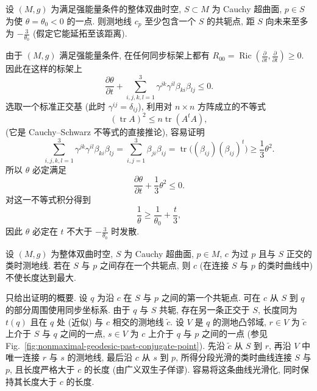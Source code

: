 \begin{RiemannProposition}\label{prop:timelike-focusing-under-strong-energy-condition}
设 $(M,g)$ 为满足强能量条件的整体双曲时空, $S\subset M$ 为 Cauchy 超曲面, $p\in S$ 为使 $\theta=\theta_0<0$ 的一点. 则测地线 $c_p$ 至少包含一个 $S$ 的共轭点, 距 $S$ 向未来至多为 $-\frac{3}{\theta_0}$ (假定它能延拓至该距离).
\end{RiemannProposition}

\begin{RiemannProof}
由于 $(M,g)$ 满足强能量条件, 在任何同步标架上都有 $R_{00}=\operatorname{Ric}(\frac{\partial}{\partial t},\frac{\partial}{\partial t})\geq0$. 因此在这样的标架上
\[
  \frac{\partial\theta}{\partial t}
  +\sum_{i,j,k,l=1}^3\gamma^{jk}\gamma^{il}\beta_{ki}\beta_{lj}\leq0.
\]
选取一个标准正交基 (此时 $\gamma^{ij}=\delta_{ij}$), 利用对 $n\times n$ 方阵成立的不等式
\[
  (\operatorname{tr}A)^2\leq n\operatorname{tr}(A^tA),
\]
(它是 Cauchy–Schwarz 不等式的直接推论), 容易证明
\[
  \sum_{i,j,k,l=1}^3\gamma^{jk}\gamma^{il}\beta_{ki}\beta_{lj}
   =\sum_{i,j=1}^3\beta_{ji}\beta_{ij}
   =\operatorname{tr}\bigl((\beta_{ij})(\beta_{ij})^t\bigr)\geq\frac{1}{3}\theta^2.
\]
所以 $\theta$ 必定满足
\[
  \frac{\partial\theta}{\partial t}+\frac{1}{3}\theta^2\leq0.
\]
对这一不等式积分得到
\[
  \frac{1}{\theta}\geq\frac{1}{\theta_0}+\frac{t}{3},
\]
因此 $\theta$ 必定在 $t$ 不大于 $-\frac{3}{\theta_0}$ 时发散.
\end{RiemannProof}

\begin{RiemannProposition}\label{prop:timelike-geodesic-not-maximal-past-conjugate-point}
设 $(M,g)$ 为整体双曲时空, $S$ 为 Cauchy 超曲面, $p\in M$, $c$ 为过 $p$ 且与 $S$ 正交的类时测地线. 若在 $S$ 与 $p$ 之间存在一个共轭点, 则 $c$ (在连接 $S$ 与 $p$ 的类时曲线中) 不使长度达到最大.
\end{RiemannProposition}

\begin{RiemannProof}
只给出证明的概要. 设 $q$ 为沿 $c$ 在 $S$ 与 $p$ 之间的第一个共轭点. 可在 $c$ 从 $S$ 到 $q$ 的部分周围使用同步坐标系. 由于 $q$ 与 $S$ 共轭, 存在另一条正交于 $S$, 长度同为 $t(q)$ 且在 $q$ 处 (近似) 与 $c$ 相交的测地线 $\widetilde c$. 设 $V$ 是 $q$ 的测地凸邻域, $r\in V$ 为 $\widetilde c$ 上介于 $S$ 与 $q$ 之间的一点, $s\in V$ 为 $c$ 上介于 $q$ 与 $p$ 之间的一点 (参见 Fig.~\ref{fig:nonmaximal-geodesic-past-conjugate-point}). 先沿 $\widetilde c$ 从 $S$ 到 $r$, 再沿 $V$ 中唯一连接 $r$ 与 $s$ 的测地线, 最后沿 $c$ 从 $s$ 到 $p$, 所得分段光滑的类时曲线连接 $S$ 与 $p$, 且长度严格大于 $c$ 的长度 (由广义双生子佯谬). 容易将这条曲线光滑化, 同时保持其长度大于 $c$ 的长度.
\end{RiemannProof}

